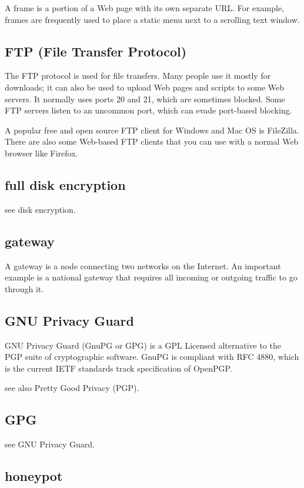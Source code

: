 A frame is a portion of a Web page with its own separate URL. For
example, frames are frequently used to place a static menu next to a
scrolling text window.

\subsection{FTP (File Transfer Protocol)}

The FTP protocol is used for file transfers. Many people use it mostly
for downloads; it can also be used to upload Web pages and scripts to
some Web servers. It normally uses ports 20 and 21, which are sometimes
blocked. Some FTP servers listen to an uncommon port, which can evade
port-based blocking.

A popular free and open source FTP client for Windows and Mac OS is
FileZilla. There are also some Web-based FTP clients that you can use
with a normal Web browser like Firefox.

\subsection{full disk encryption}

see disk encryption.

\subsection{gateway}

A gateway is a node connecting two networks on the Internet. An
important example is a national gateway that requires all incoming or
outgoing traffic to go through it.

\subsection{GNU Privacy Guard}

GNU Privacy Guard (GnuPG or GPG) is a GPL Licensed alternative to the
PGP suite of cryptographic software. GnuPG is compliant with RFC 4880,
which is the current IETF standards track specification of OpenPGP.

see also Pretty Good Privacy (PGP).

\subsection{GPG}

see GNU Privacy Guard.

\subsection{honeypot}

